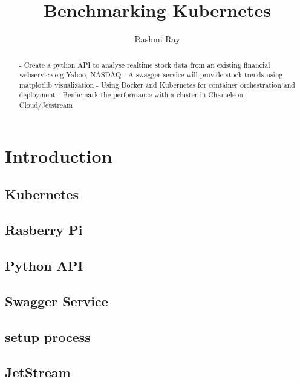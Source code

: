 
\title{Benchmarking Kubernetes}

\author{Rashmi Ray}

\renewcommand{\shortauthors}{Uma Kugan}
\begin{abstract}
 - Create a python API to analyse realtime stock data from an existing financial webservice e.g Yahoo, NASDAQ
 - A swagger service will provide stock trends using matplotlib visualization
 - Using Docker and Kubernetes for container orchestration and deployment
 - Benhcmark the performance with a cluster in Chameleon Cloud/Jetstream

\end{abstract}



\maketitle

\section{Introduction}


\subsection{Kubernetes}

\subsection{Rasberry Pi}

\subsection{Python API}
\subsection{Swagger Service}
\subsection{setup process}
\subsection{JetStream}
